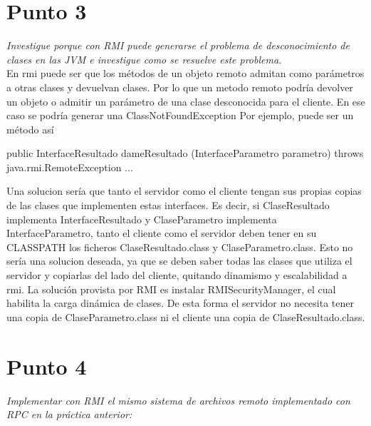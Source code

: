 \documentclass[12pt,journal,compsoc]{IEEEtran}
\begin{document}
\section{Punto 3}

\textit{Investigue porque con RMI puede generarse el problema de
desconocimiento de clases en las JVM e investigue como se resuelve este
problema.}\\

En rmi puede ser que los métodos de un objeto remoto admitan como parámetros a otras clases y devuelvan clases.  Por lo que un metodo remoto podría devolver un objeto o admitir un parámetro de una clase desconocida para el cliente. En ese caso se podría generar una ClassNotFoundException
Por ejemplo, puede ser un método así

public InterfaceResultado dameResultado (InterfaceParametro parametro) throws java.rmi.RemoteException
{
   ...
}


Una solucion sería que  tanto el servidor como el cliente tengan sus propias copias de las clases que implementen estas interfaces. Es decir, si ClaseResultado implementa InterfaceResultado y ClaseParametro implementa InterfaceParametro, tanto el cliente como el servidor deben tener en su CLASSPATH los ficheros ClaseResultado.class y ClaseParametro.class. Esto no sería una solucion deseada, ya que se deben saber todas las clases que utiliza el servidor y copiarlas del lado del cliente, quitando dinamismo y escalabilidad a rmi.
 La solución provista por RMI es instalar RMISecurityManager, el cual habilita la carga dinámica de clases. De esta forma el servidor no necesita tener una copia de ClaseParametro.class ni el cliente una copia de ClaseResultado.class. 


\section{Punto 4}

\textit{Implementar con RMI el mismo sistema de archivos remoto
implementado con RPC en la práctica anterior:}
\end{document}
